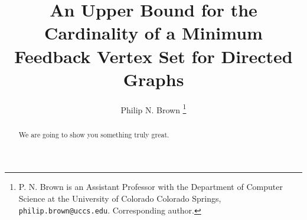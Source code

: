 \documentclass[journal,12pt,onecolumn]{IEEETran}  %
\begin{document}
%
\title{An Upper Bound for the Cardinality of a Minimum Feedback Vertex Set for Directed Graphs}


\author{{Philip N. Brown}
\thanks{P. N. Brown is an Assistant Professor with the Department of Computer Science at the University of Colorado Colorado Springs, {\texttt{philip.brown@uccs.edu}. Corresponding author.}}
}


% 








\maketitle

\begin{abstract}
We are going to show you something truly great.
\end{abstract}
\end{document}
